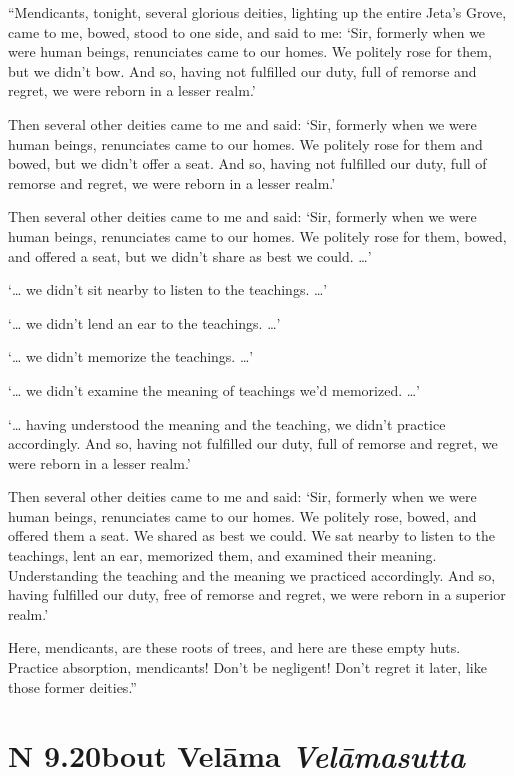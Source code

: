 \documentclass[12pt,openany]{book}%
\newcommand*{\suttatitleacronym}[1]{\smaller[2]{#1}\vspace*{.3em}}
\newcommand*{\suttatitletranslation}[1]{\linebreak{#1}}
\newcommand*{\suttatitleroot}[1]{\linebreak\smaller[2]\itshape{#1}}
\newcommand*{\tocacronym}[1]{\hspace*{-3.3em}{#1}\quad}
\newcommand*{\toctranslation}[1]{#1}
\newcommand*{\tocroot}[1]{(\textit{#1})}
\begin{document}
“Mendicants, tonight, several glorious deities, lighting up the entire Jeta’s Grove, came to me, bowed, stood to one side, and said to me: ‘Sir, formerly when we were human beings, renunciates came to our homes. We politely rose for them, but we didn’t bow. And so, having not fulfilled our duty, full of remorse and regret, we were reborn in a lesser realm.’ 

Then several other deities came to me and said: ‘Sir, formerly when we were human beings, renunciates came to our homes. We politely rose for them and bowed, but we didn’t offer a seat. And so, having not fulfilled our duty, full of remorse and regret, we were reborn in a lesser realm.’ 

Then several other deities came to me and said: ‘Sir, formerly when we were human beings, renunciates came to our homes. We politely rose for them, bowed, and offered a seat, but we didn’t share as best we could. …’ 

‘… we didn’t sit nearby to listen to the teachings. …’ 

‘… we didn’t lend an ear to the teachings. …’ 

‘… we didn’t memorize the teachings. …’ 

‘… we didn’t examine the meaning of teachings we’d memorized. …’ 

‘… having understood the meaning and the teaching, we didn’t practice accordingly. And so, having not fulfilled our duty, full of remorse and regret, we were reborn in a lesser realm.’ 

Then several other deities came to me and said: ‘Sir, formerly when we were human beings, renunciates came to our homes. We politely rose, bowed, and offered them a seat. We shared as best we could. We sat nearby to listen to the teachings, lent an ear, memorized them, and examined their meaning. Understanding the teaching and the meaning we practiced accordingly. And so, having fulfilled our duty, free of remorse and regret, we were reborn in a superior realm.’ 

Here, mendicants, are these roots of trees, and here are these empty huts. Practice absorption, mendicants! Don’t be negligent! Don’t regret it later, like those former deities.” 

%
\section*{{\suttatitleacronym AN 9.20}{\suttatitletranslation About Velāma }{\suttatitleroot Velāmasutta}}
\addcontentsline{toc}{section}{\tocacronym{AN 9.20} \toctranslation{About Velāma } \tocroot{Velāmasutta}}
\end{document}
